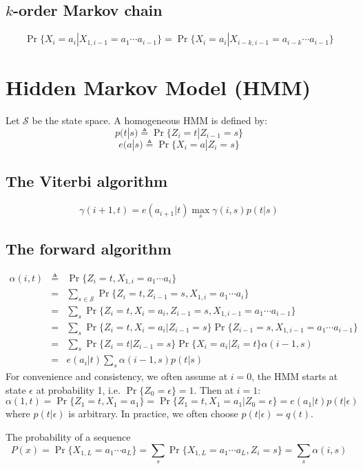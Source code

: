 \documentclass[10pt]{article}
\begin{document}
\subsection{$k$-order Markov chain}
$$
\Pr\{X_i=a_i|X_{1,i-1}=a_1\cdots a_{i-1}\}=\Pr\{X_i=a_i|X_{i-k,i-1}=a_{i-k}\cdots a_{i-1}\}
$$

\newpage

\section{Hidden Markov Model (HMM)}
Let $\mathcal{S}$ be the state space. A homogeneous HMM is defined by:
$$
p(t|s)\triangleq\Pr\{Z_i=t|Z_{i-1}=s\}
$$
$$
e(a|s)\triangleq\Pr\{X_i=a|Z_i=s\}
$$

\subsection{The Viterbi algorithm}
$$
\gamma(i+1,t)=e(a_{i+1}|t)\max_s\gamma(i,s)p(t|s)
$$

\subsection{The forward algorithm}
\begin{eqnarray*}
\alpha(i,t)&\triangleq&\Pr\{Z_i=t,X_{1,i}=a_1\cdots a_i\}\\
&=&\sum_{s\in\mathcal{S}}\Pr\{Z_i=t,Z_{i-1}=s,X_{1,i}=a_1\cdots a_i\}\\
&=&\sum_s\Pr\{Z_i=t,X_i=a_i,Z_{i-1}=s,X_{1,{i-1}}=a_1\cdots a_{i-1}\}\\
&=&\sum_s\Pr\{Z_i=t,X_i=a_i|Z_{i-1}=s\}\Pr\{Z_{i-1}=s,X_{1,{i-1}}=a_1\cdots a_{i-1}\}\\
&=&\sum_s\Pr\{Z_i=t|Z_{i-1}=s\}\Pr\{X_i=a_i|Z_i=t\}\alpha(i-1,s)\\
&=&e(a_i|t)\sum_s\alpha(i-1,s)p(t|s)
\end{eqnarray*}
For convenience and consistency, we often assume at $i=0$, the HMM starts at
state $\epsilon$ at probability 1, i.e. $\Pr\{Z_0=\epsilon\}=1$. Then at $i=1$:
$$
\alpha(1,t)=\Pr\{Z_1=t,X_1=a_1\}=\Pr\{Z_1=t,X_1=a_1|Z_0=\epsilon\}=e(a_1|t)p(t|\epsilon)
$$
where $p(t|\epsilon)$ is arbitrary. In practice, we often choose
$p(t|\epsilon)=q(t)$.

The probability of a sequence
$$
P(x)=\Pr\{X_{1,L}=a_1\cdots a_L\}=\sum_s\Pr\{X_{1,L}=a_1\cdots a_L,Z_i=s\}=\sum_s\alpha(i,s)
$$
\end{document}
